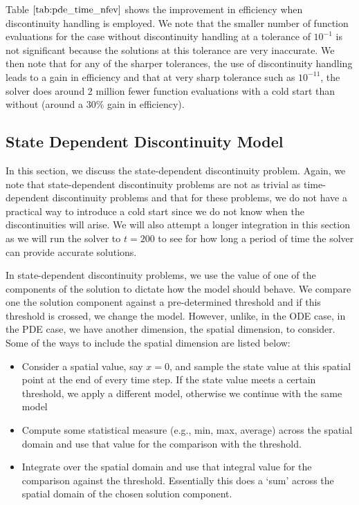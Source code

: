 \documentclass{article}
\begin{document}
Table $\ref{tab:pde_time_nfev}$ shows the improvement in efficiency when discontinuity handling is employed. We note that the smaller number of function evaluations for the case without discontinuity handling at a tolerance of $10^{-1}$ is not significant because the solutions at this tolerance are very inaccurate. We then note that for any of the sharper tolerances, the use of discontinuity handling leads to a gain in efficiency and that at very sharp tolerance such as $10^{-11}$, the solver does around 2 million fewer function evaluations with a cold start than without (around a $30\%$ gain in efficiency). 

\subsection{State Dependent Discontinuity Model}
\label{subsection:pde_state_intro}
In this section, we discuss the state-dependent discontinuity problem. Again, we note that state-dependent discontinuity problems are not as trivial as time-dependent discontinuity problems and that for these problems, we do not have a practical way to introduce a cold start since we do not know when the discontinuities will arise. We will also attempt a longer integration in this section as we will run the solver to $t=200$ to see for how long a period of time the solver can provide accurate solutions.

In state-dependent discontinuity problems, we use the value of one of the components of the solution to dictate how the model should behave. We compare one the solution component against a pre-determined threshold and if this threshold is crossed, we change the model. However, unlike, in the ODE case, in the PDE case, we have another dimension, the spatial dimension, to consider. Some of the ways to include the spatial dimension are listed below:
\begin{itemize}
\item Consider a spatial value, say $x=0$, and sample the state value at this spatial point at the end of every time step. If the state value meets a certain threshold, we apply a different model, otherwise we continue with the same model

\item Compute some statistical measure (e.g., min, max, average) across the spatial domain and use that value for the comparison with the threshold.

\item Integrate over the spatial domain and use that integral value for the comparison against the threshold. Essentially this does a `sum' across the spatial domain of the chosen solution component.
\end{itemize}
\end{document}

